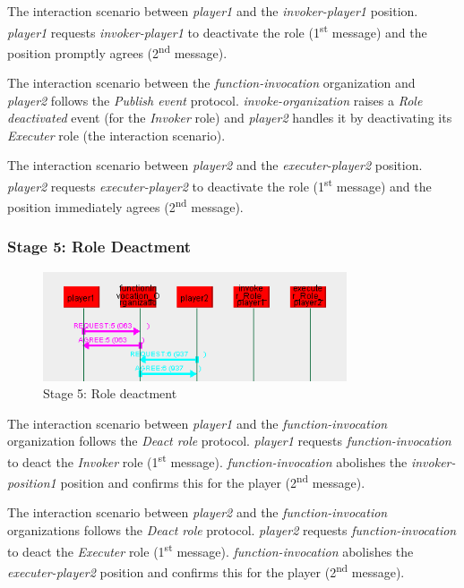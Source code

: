 The {} interaction scenario between \textit{player1}  and the \textit{invoker-player1} position.
\textit{player1} requests \textit{invoker-player1} to deactivate the role (1\textsuperscript{st} message) and the position promptly agrees (2\textsuperscript{nd} message).

The {} interaction scenario between the \textit{function-invocation} organization and \textit{player2} follows the \textit{Publish event} protocol.
\textit{invoke-organization} raises a \textit{Role deactivated} event (for the \textit{Invoker} role) and \textit{player2} handles it by deactivating its \textit{Executer} role (the {} interaction scenario).

The {} interaction scenario between \textit{player2} and the \textit{executer-player2} position.
\textit{player2} requests \textit{executer-player2} to deactivate the role (1\textsuperscript{st} message) and the position immediately agrees (2\textsuperscript{nd} message).

\subsubsection*{Stage 5: Role Deactment}

\begin{figure}[H]
	\centering
	\includegraphics[width=0.8\textwidth]{images/examples/example1-stage5.png}
	\caption{Stage 5: Role deactment}
	\label{figure:example1-stage5}
\end{figure} 

The {} interaction scenario between \textit{player1} and the \textit{function-invocation} organization follows the \textit{Deact role} protocol.
\textit{player1} requests \textit{function-invocation} to deact the \textit{Invoker} role (1\textsuperscript{st} message).
\textit{function-invocation} abolishes the \textit{invoker-position1} position and confirms this for the player (2\textsuperscript{nd} message).

The {} interaction scenario between \textit{player2} and the \textit{function-invocation} organizations follows the \textit{Deact role} protocol.
\textit{player2} requests \textit{function-invocation} to deact the \textit{Executer} role (1\textsuperscript{st} message).
\textit{function-invocation} abolishes the \textit{executer-player2} position and confirms this for the player (2\textsuperscript{nd} message).
